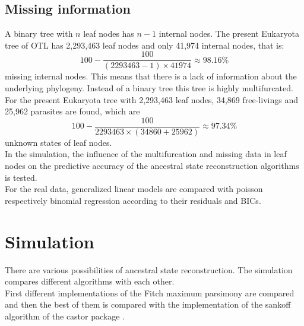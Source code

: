     \subsection{Missing information}

      A binary tree with $n$ leaf nodes has $n-1$ internal nodes. The present Eukaryota tree of OTL has 
        2,293,463 leaf nodes and only 41,974 internal nodes, that is:
      $$100-\frac{100}{(2293463-1) \times 41974} \approx 98.16 \%$$
        missing internal nodes. This means that there is a lack of information about the underlying 
        phylogeny. Instead of a binary tree this tree is highly multifurcated. \\


      For the present Eukaryota tree with 2,293,463 leaf nodes, 34,869 free-livings and 25,962 parasites 
        are found, which are
        $$100-\frac{100}{2293463 \times (34860+25962)} \approx 97.34 \%$$
        unknown states of leaf nodes. \\

      In the simulation, the influence of the multifurcation and missing data in leaf nodes on the 
        predictive accuracy of the ancestral state reconstruction algorithms is tested. \\
      For the real data, generalized linear models are compared with poisson respectively binomial 
        regression according to their residuals and BICs.

  \section{Simulation}\label{sec:simulation}
    There are various possibilities of ancestral state reconstruction. The simulation compares
      different algorithms with each other. \\
    First different implementations of the Fitch maximum parsimony are compared and then the best of 
      them is compared with the implementation of the sankoff algorithm of the castor package 
      \cite{Louca2017}. \\


